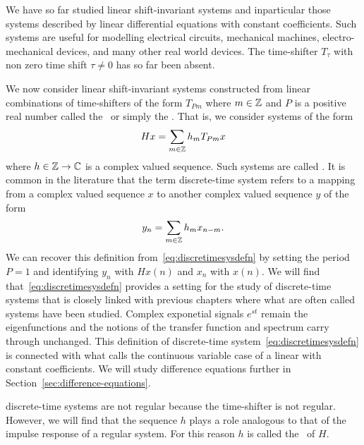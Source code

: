 We have so far studied linear shift-invariant systems and inparticular those systems described by linear differential equations with constant coefficients.  Such systems are useful for modelling electrical circuits, mechanical machines, electro-mechanical devices, and many other real world devices.  %
The time-shifter $T_\tau$ with non zero time shift $\tau \neq 0$ has so far been absent.  %

We now consider linear shift-invariant systems constructed from linear combinations of time-shifters of the form $T_{Pm}$ where $m \in {\mathbb Z}$ and $P$ is a positive real number called the~ or simply the .  That is, we consider systems of the form
\begin{equation}\label{eq:discretimesysdefn}
H x = \sum_{m \in {\mathbb Z}} h_m T_{ P m} x
\end{equation}
where $h \in {\mathbb Z} \to {\mathbb C}$ is a complex valued sequence.  Such systems are called .  It is common in the literature that the term discrete-time system refers to a mapping from a complex valued sequence $x$ to another complex valued sequence $y$ of the form
\[
y_n = \sum_{m \in {\mathbb Z}} h_m x_{n-m}.
\]
We can recover this definition from~\eqref{eq:discretimesysdefn} by setting the period $P = 1$ and identifying $y_n$ with $Hx(n)$ and $x_n$ with $x(n)$.  %
We will find that~\eqref{eq:discretimesysdefn} provides a setting for the study of discrete-time systems that is closely linked with previous chapters where what are often called  systems have been studied.  Complex exponetial signals $e^{st}$ remain the eigenfunctions and the notions of the transfer function and spectrum carry through unchanged.  This definition of discrete-time system~\eqref{eq:discretimesysdefn} is connected with what \citet[Sec.~9.5]{Zemanian_dist_theory_1965} calls the continuous variable case of a linear  with constant coefficients.  We will study difference equations further in Section~\ref{sec:difference-equations}.

discrete-time systems are not regular because the time-shifter is not regular.  However, we will find that the sequence $h$ plays a role analogous to that of the impulse response of a regular system.  For this reason $h$ is called the~ of $H$.


